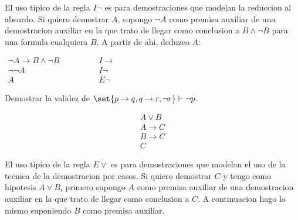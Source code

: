 \begin{remark}
	El uso tipico de la regla \(I \neg \) es para demostraciones que modelan la reduccion al absurdo. Si quiero demostrar \(A \), supongo \(\neg A \) como premisa auxiliar de una demostracion auxiliar en la que trato de llegar como conclusion a \(B \wedge \neg B\) para una formula cualquiera \(B \). A partir de ahi, deduzco \(A \):
	\begin{center}
		\begin{minipage}{0.4\textwidth}
			\(
			\begin{array}{lr}
				\neg A \rightarrow B \wedge \neg B \qquad\qquad & I \rightarrow \\
				\neg \neg A \qquad \qquad                       & I \neg        \\
				A  \qquad \qquad                                & E \neg
			\end{array}
			\)
		\end{minipage}
	\end{center}
\end{remark}



\begin{example}
	Demostrar la validez de \(\set{p\rightarrow q, q \rightarrow r, \neg r} \vdash \neg p \).

\end{example}

\begin{definition}
	\[
		\begin{array}{c}
			A \vee B        \\
			A \rightarrow C \\
			B \rightarrow C \\ \hline
			C
		\end{array}
	\]
\end{definition}

\begin{remark}
	El uso tipico de la regla \(E \vee \) es para demostraciones que modelan el uso de la tecnica de la demostracion por casos. Si quiero demostrar \(C \) y tengo como hipotesis \(A \vee  B \), primero supongo \(A \) como premisa auxiliar de una demostracion auxiliar en la que trato de llegar como conclusion a \(C \). A continuacion hago lo mismo suponiendo \(B \) como premisa auxiliar.
\end{remark}

